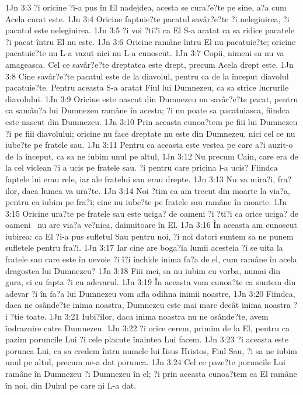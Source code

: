 1Jn 3:3  ?i oricine ?i-a pus în El nadejdea, acesta se cura?e?te pe sine, a?a cum Acela curat este.
1Jn 3:4  Oricine faptuie?te pacatul savâr?e?te ?i nelegiuirea, ?i pacatul este nelegiuirea.
1Jn 3:5  ?i voi ?ti?i ca El S-a aratat ca sa ridice pacatele ?i pacat întru El nu este.
1Jn 3:6  Oricine ramâne întru El nu pacatuie?te; oricine pacatuie?te nu L-a vazut nici nu L-a cunoscut.
1Jn 3:7  Copii, nimeni sa nu va amageasca. Cel ce savâr?e?te dreptatea este drept, precum Acela drept este.
1Jn 3:8  Cine savâr?e?te pacatul este de la diavolul, pentru ca de la început diavolul pacatuie?te. Pentru aceasta S-a aratat Fiul lui Dumnezeu, ca sa strice lucrurile diavolului.
1Jn 3:9  Oricine este nascut din Dumnezeu nu savâr?e?te pacat, pentru ca samân?a lui Dumnezeu ramâne în acesta; ?i nu poate sa pacatuiasca, fiindca este nascut din Dumnezeu.
1Jn 3:10  Prin aceasta cunoa?tem pe fiii lui Dumnezeu ?i pe fiii diavolului; oricine nu face dreptate nu este din Dumnezeu, nici cel ce nu iube?te pe fratele sau.
1Jn 3:11  Pentru ca aceasta este vestea pe care a?i auzit-o de la început, ca sa ne iubim unul pe altul,
1Jn 3:12  Nu precum Cain, care era de la cel viclean ?i a ucis pe fratele sau. ?i pentru care pricina l-a ucis? Fiindca faptele lui erau rele, iar ale fratelui sau erau drepte.
1Jn 3:13  Nu va mira?i, fra?ilor, daca lumea va ura?te.
1Jn 3:14  Noi ?tim ca am trecut din moarte la via?a, pentru ca iubim pe fra?i; cine nu iube?te pe fratele sau ramâne în moarte.
1Jn 3:15  Oricine ura?te pe fratele sau este uciga? de oameni ?i ?ti?i ca orice uciga? de oameni  nu are via?a ve?nica, dainuitoare în El.
1Jn 3:16  În aceasta am cunoscut iubirea: ca El ?i-a pus sufletul Sau pentru noi, ?i noi datori suntem sa ne punem sufletele pentru fra?i.
1Jn 3:17  Iar cine are boga?ia lumii acesteia ?i se uita la fratele sau care este în nevoie ?i î?i închide inima fa?a de el, cum ramâne în acela dragostea lui Dumnezeu?
1Jn 3:18  Fiii mei, sa nu iubim cu vorba, numai din gura, ci cu fapta ?i cu adevarul.
1Jn 3:19  În aceasta vom cunoa?te ca suntem din adevar ?i în fa?a lui Dumnezeu vom afla odihna inimii noastre,
1Jn 3:20  Fiindca, daca ne osânde?te inima noastra, Dumnezeu este mai mare decât inima noastra ?i ?tie toate.
1Jn 3:21  Iubi?ilor, daca inima noastra nu ne osânde?te, avem îndraznire catre Dumnezeu.
1Jn 3:22  ?i orice cerem, primim de la El, pentru ca pazim poruncile Lui ?i cele placute înaintea Lui facem.
1Jn 3:23  ?i aceasta este porunca Lui, ca sa credem întru numele lui Iisus Hristos, Fiul Sau, ?i sa ne iubim unul pe altul, precum ne-a dat porunca.
1Jn 3:24  Cel ce paze?te poruncile Lui ramâne în Dumnezeu ?i Dumnezeu în el; ?i prin aceasta cunoa?tem ca El ramâne în noi, din Duhul pe care ni L-a dat.
